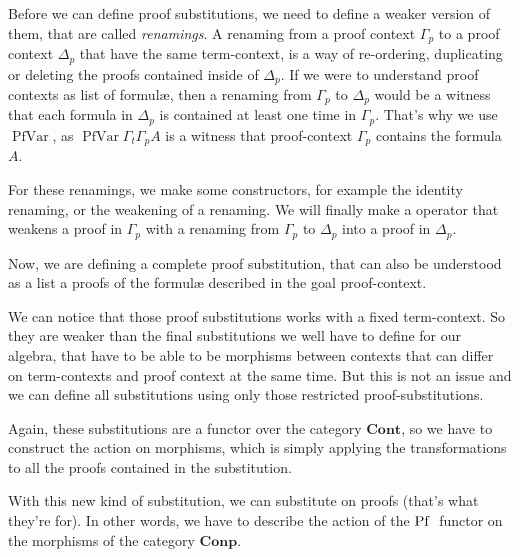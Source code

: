 \documentclass[10pt,a4paper]{article}
\begin{document}
			Before we can define proof substitutions, we need to define a weaker version of them, that are called \emph{renamings}. A renaming from a proof context $Γ_p$ to a proof context $Δ_p$ that have the same term-context, is a way of re-ordering, duplicating or deleting the proofs contained inside of $Δ_p$. If we were to understand proof contexts as list of formulæ, then a renaming from $Γ_p$ to $Δ_p$ would be a witness that each formula in $Δ_p$ is contained at least one time in $Γ_p$. That's why we use $\operatorname{PfVar}$, as $\operatorname{PfVar} Γ_t Γ_p A$ is a witness that proof-context $Γ_p$ contains the formula $A$.
			
			For these renamings, we make some constructors, for example the identity renaming, or the weakening of a renaming. We will finally make a operator that weakens a proof in $Γ_p$ with a renaming from $Γ_p$ to $Δ_p$ into a proof in $Δ_p$.
			
			\begin{tcolorbox}
				\vspace{-2ex}
				\vspace{-7.5ex}
			\end{tcolorbox}
		
			Now, we are defining a complete proof substitution, that can also be understood as a list a proofs of the formulæ described in the goal proof-context.
			
			We can notice that those proof substitutions works with a fixed term-context. So they are weaker than the final substitutions we well have to define for our algebra, that have to be able to be morphisms between contexts that can differ on term-contexts and proof context at the same time. But this is not an issue and we can define all substitutions using only those restricted proof-substitutions.
			
			Again, these substitutions are a functor over the category $\textbf{Cont}$, so we have to construct the action on morphisms, which is simply applying the transformations to all the proofs contained in the substitution.
			
			\begin{tcolorbox}
				\vspace{-2ex}
				\agda{agda/ISubp.tex}
				\agdasep
				\agda{agda/ISubtS.tex}
				\vspace{-7.5ex}
			\end{tcolorbox}
		
			With this new kind of substitution, we can substitute on proofs (that's what they're for). In other words, we have to describe the action of the $\operatorname{Pf}\;$ functor on the morphisms of the category $\textbf{Conp}$.
			
\end{document}
